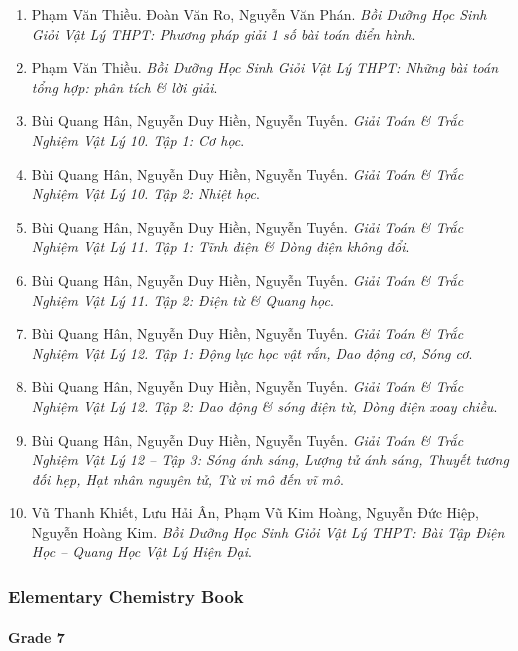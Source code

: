 \documentclass{article}
\begin{document}
\begin{enumerate}
	\item Phạm Văn Thiều. Đoàn Văn Ro, Nguyễn Văn Phán. {\it Bồi Dưỡng Học Sinh Giỏi Vật Lý THPT: Phương pháp giải 1 số bài toán điển hình}.
	
	\item Phạm Văn Thiều. {\it Bồi Dưỡng Học Sinh Giỏi Vật Lý THPT: Những bài toán tổng hợp: phân tích \& lời giải}.
	
	\item Bùi Quang Hân, Nguyễn Duy Hiền, Nguyễn Tuyến. {\it Giải Toán \& Trắc Nghiệm Vật Lý 10. Tập 1: Cơ học}.
	
	\item Bùi Quang Hân, Nguyễn Duy Hiền, Nguyễn Tuyến. {\it Giải Toán \& Trắc Nghiệm Vật Lý 10. Tập 2: Nhiệt học}.
	
	\item Bùi Quang Hân, Nguyễn Duy Hiền, Nguyễn Tuyến. {\it Giải Toán \& Trắc Nghiệm Vật Lý 11. Tập 1: Tĩnh điện \& Dòng điện không đổi}.
	
	\item Bùi Quang Hân, Nguyễn Duy Hiền, Nguyễn Tuyến. {\it Giải Toán \& Trắc Nghiệm Vật Lý 11. Tập 2: Điện từ \& Quang học}.
	
	\item Bùi Quang Hân, Nguyễn Duy Hiền, Nguyễn Tuyến. {\it Giải Toán \& Trắc Nghiệm Vật Lý 12. Tập 1: Động lực học vật rắn, Dao động cơ, Sóng cơ}.
	
	\item Bùi Quang Hân, Nguyễn Duy Hiền, Nguyễn Tuyến. {\it Giải Toán \& Trắc Nghiệm Vật Lý 12. Tập 2: Dao động \& sóng điện từ, Dòng điện xoay chiều}.
	
	\item Bùi Quang Hân, Nguyễn Duy Hiền, Nguyễn Tuyến. {\it Giải Toán \& Trắc Nghiệm Vật Lý 12 -- Tập 3: Sóng ánh sáng, Lượng tử ánh sáng, Thuyết tương đối hẹp, Hạt nhân nguyên tử, Từ vi mô đến vĩ mô}.
	
	\item Vũ Thanh Khiết, Lưu Hải Ân, Phạm Vũ Kim Hoàng, Nguyễn Đức Hiệp, Nguyễn Hoàng Kim. {\it Bồi Dưỡng Học Sinh Giỏi Vật Lý THPT: Bài Tập Điện Học -- Quang Học Vật Lý Hiện Đại}.
\end{enumerate}

\subsubsection{Elementary Chemistry Book}

\paragraph{Grade 7}
\end{document}

